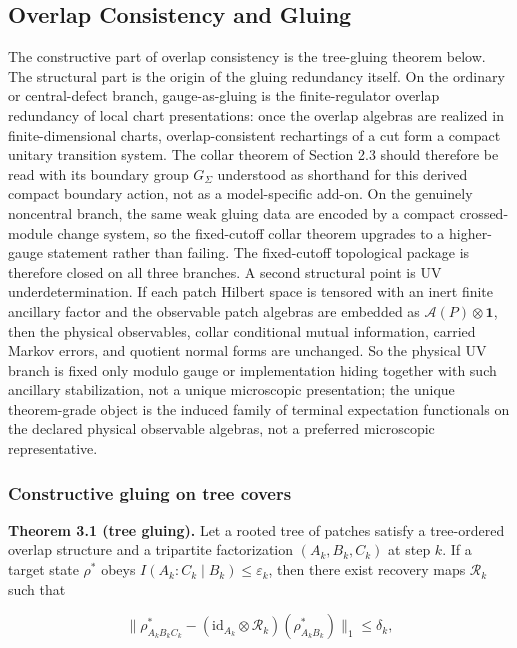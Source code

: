 \subsection{Overlap Consistency and Gluing}\label{3-overlap-consistency-and-gluing}

The constructive part of overlap consistency is the tree-gluing theorem below. The structural part is the origin of the gluing redundancy itself. On the ordinary or central-defect branch, gauge-as-gluing is the finite-regulator overlap redundancy of local chart presentations: once the overlap algebras are realized in finite-dimensional charts, overlap-consistent rechartings of a cut form a compact unitary transition system. The collar theorem of Section 2.3 should therefore be read with its boundary group \(G_\Sigma\) understood as shorthand for this derived compact boundary action, not as a model-specific add-on. On the genuinely noncentral branch, the same weak gluing data are encoded by a compact crossed-module change system, so the fixed-cutoff collar theorem upgrades to a higher-gauge statement rather than failing. The fixed-cutoff topological package is therefore closed on all three branches.
A second structural point is UV underdetermination. If each patch Hilbert space is tensored with an inert finite ancillary factor and the observable patch algebras are embedded as \(\mathcal A(P)\otimes \mathbf 1\), then the physical observables, collar conditional mutual information, carried Markov errors, and quotient normal forms are unchanged. So the physical UV branch is fixed only modulo gauge or implementation hiding together with such ancillary stabilization, not a unique microscopic presentation; the unique theorem-grade object is the induced family of terminal expectation functionals on the declared physical observable algebras, not a preferred microscopic representative.

\subsubsection{Constructive gluing on tree covers}\label{31-constructive-gluing-on-tree-covers}

\textbf{Theorem 3.1 (tree gluing).} Let a rooted tree of patches satisfy a tree-ordered overlap structure and a tripartite factorization \((A_k, B_k, C_k)\) at step \(k\). If a target state \(\rho^{\ast}\) obeys \(I(A_k:C_k \mid B_k) \le \varepsilon_k\), then there exist recovery maps \(\mathcal{R}_k\) such that

\[
\| \rho^{\ast}_{A_k B_k C_k} - (\mathrm{id}_{A_k} \otimes \mathcal{R}_k)(\rho^{\ast}_{A_k B_k}) \|_1
\le \delta_k,
\]

